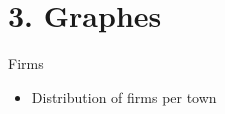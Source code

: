 \documentclass[xcolor=dvipsnames]{beamer}
\begin{document}



\section{3. Graphes}
	\begin{frame}{\centerline{\huge\textcolor{bscuro}{Firms}}}
\begin{itemize}
		\item Distribution of firms per town
\end{itemize}
			\begin{figure}[!ht] 
				\centering
			\end{figure}
\end{frame}
\end{document}
